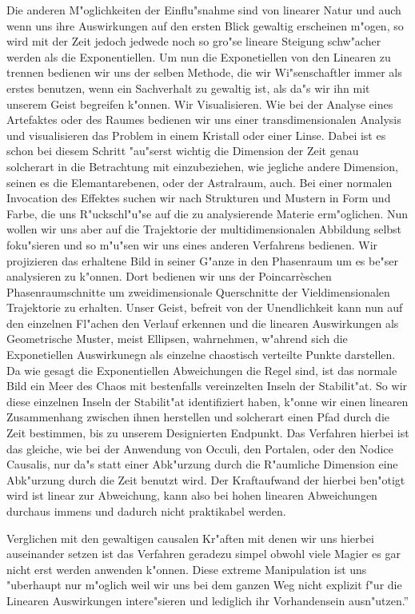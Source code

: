 \documentclass[a5paper,8pt]{book}
\begin{document}
Die anderen M"oglichkeiten der Einflu"snahme sind von linearer Natur und auch wenn uns ihre Auswirkungen auf den ersten Blick gewaltig erscheinen m"ogen, so wird mit der Zeit jedoch jedwede noch so gro"se lineare Steigung schw"acher werden als die Exponentiellen.
Um nun die Exponetiellen von den Linearen zu trennen bedienen wir uns der selben Methode, die wir Wi"senschaftler immer als erstes benutzen, wenn ein Sachverhalt zu gewaltig ist, als da"s wir ihn mit unserem Geist begreifen k"onnen. Wir Visualisieren. Wie bei der Analyse eines Artefaktes oder des Raumes bedienen wir uns einer transdimensionalen Analysis und visualisieren das Problem in einem Kristall oder einer Linse. Dabei ist es schon bei diesem Schritt "au"serst wichtig die Dimension der Zeit genau solcherart in die Betrachtung mit einzubeziehen, wie jegliche andere Dimension, seinen es die Elemantarebenen, oder der Astralraum, auch.
Bei einer normalen Invocation des Effektes suchen wir nach Strukturen und Mustern in Form und Farbe, die uns R"uckschl"u"se auf die zu analysierende Materie erm"oglichen.
Nun wollen wir uns aber auf die Trajektorie der multidimensionalen Abbildung selbst foku"sieren und so m"u"sen wir uns eines anderen Verfahrens bedienen.
Wir projizieren das erhaltene Bild in seiner G"anze in den Phasenraum um es be"ser analysieren zu k"onnen. Dort bedienen wir uns der Poincarr\`{e}schen Phasenraumschnitte um zweidimensionale Querschnitte der Vieldimensionalen Trajektorie zu erhalten.
Unser Geist, befreit von der Unendlichkeit kann nun auf den einzelnen Fl"achen den Verlauf erkennen und die linearen Auswirkungen als Geometrische Muster, meist Ellipsen, wahrnehmen, w"ahrend sich die Exponetiellen Auswirkunegn als einzelne chaostisch verteilte Punkte darstellen.
Da wie gesagt die Exponentiellen Abweichungen die Regel sind, ist das normale Bild ein Meer des Chaos mit bestenfalls vereinzelten Inseln der Stabilit"at.
So wir diese einzelnen Inseln der Stabilit"at identifiziert haben, k"onne wir einen linearen Zusammenhang zwischen ihnen herstellen und solcherart einen Pfad durch die Zeit bestimmen, bis zu unserem Designierten Endpunkt.
Das Verfahren hierbei ist das gleiche, wie bei der Anwendung von Occuli, den Portalen, oder den Nodice Causalis, nur da"s statt einer Abk"urzung durch die R"aumliche Dimension eine Abk"urzung durch die Zeit benutzt wird.
Der Kraftaufwand der hierbei ben"otigt wird ist linear zur Abweichung, kann also bei hohen linearen Abweichungen durchaus immens und dadurch nicht praktikabel werden.

Verglichen mit den gewaltigen causalen Kr"aften mit denen wir uns hierbei auseinander setzen ist das Verfahren geradezu simpel obwohl viele Magier es gar nicht erst werden anwenden k"onnen. Diese extreme Manipulation ist uns "uberhaupt nur m"oglich weil wir uns bei dem ganzen Weg nicht explizit f"ur die Linearen Auswirkungen intere"sieren und lediglich ihr Vorhandensein ausn"utzen.''\\
\end{document}
